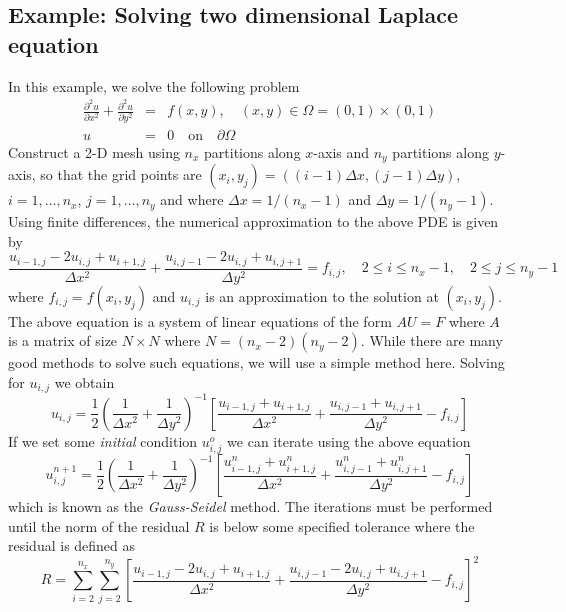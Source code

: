 \documentclass[11pt,oneside]{amsart}
\begin{document}
\subsection{Example: Solving two dimensional Laplace equation}
\label{lap}
In this example, we solve the following problem
\begin{eqnarray*}
\frac{\partial^2 u}{\partial x^2} + \frac{\partial^2 u}{\partial y^2} &=& f(x,y), \quad (x,y) \in \Omega = (0,1) \times (0,1) \\
u &=& 0 \quad \textrm{on} \quad \partial \Omega
\end{eqnarray*}
Construct a 2-D mesh using $n_x$ partitions along $x$-axis and $n_y$ partitions along $y$-axis, so that the grid points are $(x_i,y_j) = ((i-1)\Delta x, (j-1)\Delta y)$, $i=1,\ldots,n_x$, $j=1,\ldots,n_y$ and where $\Delta x = 1/(n_x-1)$ and $\Delta y = 1/(n_y-1)$. Using finite differences, the numerical approximation to the above PDE is given by
\begin{equation*}
\frac{u_{i-1,j} - 2 u_{i,j} + u_{i+1,j}}{\Delta x^2} +
\frac{u_{i,j-1} - 2 u_{i,j} + u_{i,j+1}}{\Delta y^2} = f_{i,j}, \quad 2 \le i \le n_x-1, \quad 2 \le j \le n_y-1
\end{equation*}
where $f_{i,j} = f(x_i, y_j)$ and $u_{i,j}$ is an approximation to the solution at $(x_i,y_j)$. The above equation is a system of linear equations of the form $AU=F$ where $A$ is a matrix of size $N \times N$ where $N=(n_x-2)(n_y-2)$. While there are many good methods to solve such equations, we will use a simple method here. Solving for $u_{i,j}$ we obtain
\begin{equation*}
u_{i,j} = \frac{1}{2} \left( \frac{1}{\Delta x^2} + \frac{1}{\Delta y^2} \right)^{-1} \left[ \frac{u_{i-1,j} + u_{i+1,j}}{\Delta x^2} + \frac{u_{i,j-1} + u_{i,j+1}}{\Delta y^2} - f_{i,j} \right]
\end{equation*}
If we set some {\em initial} condition $u^o_{i,j}$ we can iterate using the above equation
\begin{equation*}
u^{n+1}_{i,j} = \frac{1}{2} \left( \frac{1}{\Delta x^2} + \frac{1}{\Delta y^2} \right)^{-1} \left[ \frac{u^n_{i-1,j} + u^n_{i+1,j}}{\Delta x^2} + \frac{u^n_{i,j-1} + u^n_{i,j+1}}{\Delta y^2} - f_{i,j} \right]
\end{equation*}
which is known as the {\em Gauss-Seidel} method. The iterations must be performed until the norm of the residual $R$ is below some specified tolerance where the residual is defined as
\begin{equation*}
R = \sum_{i=2}^{n_x} \sum_{j=2}^{n_y} \left[ \frac{u_{i-1,j} - 2 u_{i,j} + u_{i+1,j}}{\Delta x^2} +
\frac{u_{i,j-1} - 2 u_{i,j} + u_{i,j+1}}{\Delta y^2} - f_{i,j} \right]^2
\end{equation*}
\end{document}
